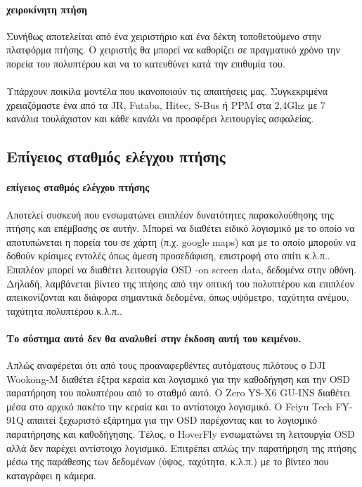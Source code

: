 \documentclass[a4paper, 12pt, twoside]{report}
\begin{document}
{{{{{{			\paragraph{χειροκίνητη πτήση}{Συνήθως αποτελείται από ένα χειριστήριο και ένα δέκτη τοποθετούμενο στην πλατφόρμα πτήσης. Ο χειριστής θα μπορεί να καθορίζει σε πραγματικό χρόνο την πορεία του πολυπτέρου και να το κατευθύνει κατά την επιθυμία του.
			}
			\paragraph{}{Υπάρχουν ποικίλα μοντέλα που ικανοποιούν τις απαιτήσεις μας. Συγκεκριμένα χρειαζόμαστε ένα από τα JR, Futaba, Hitec, S-Bus ή PPM στα 2,4Ghz με 7 κανάλια τουλάχιστον και κάθε κανάλι να προσφέρει λειτουργίες ασφαλείας.
			}
			
		\subsection{Επίγειος σταθμός ελέγχου πτήσης}	
			\paragraph{επίγειος σταθμός ελέγχου πτήσης}{Αποτελεί συσκευή που ενσωματώνει επιπλέον δυνατότητες παρακολούθησης της πτήσης και επέμβασης σε αυτήν. Μπορεί να διαθέτει ειδικό λογισμικό με το οποίο να αποτυπώνεται η πορεία του σε χάρτη (π.χ. google maps) και με το οποίο μπορούν να δοθούν κρίσιμες εντολές όπως άμεση προσεδάφιση, επιστροφή στο σπίτι κ.λ.π.. Επιπλέον μπορεί να διαθέτει λειτουργία OSD -on screen data, δεδομένα στην οθόνη. Δηλαδή, λαμβάνεται βίντεο της πτήσης από την οπτική του πολυπτέρου και επιπλέον απεικονίζονται και διάφορα σημαντικά δεδομένα, όπως υψόμετρο, ταχύτητα ανέμου, ταχύτητα πολυπτέρου κ.λ.π..
			}
			\paragraph{Το σύστημα αυτό δεν θα αναλυθεί στην έκδοση αυτή του κειμένου.}{Απλώς αναφέρεται ότι από τους προαναφερθέντες αυτόματους πιλότους ο DJI Wookong-M διαθέτει έξτρα κεραία και λογισμικό για την καθοδήγηση και την OSD παρατήρηση του πολυπτέρου από το σταθμό αυτό. Ο Zero YS-X6 GU-INS διαθέτει μέσα στο αρχικό πακέτο την κεραία και το αντίστοιχο λογισμικό. Ο Feiyu Tech FY-91Q απαιτεί ξεχωριστό εξάρτημα για την OSD παρέχοντας και το λογισμικό παρατήρησης και καθοδήγησης. Τέλος, ο HoverFly ενσωματώνει τη λειτουργία OSD αλλά δεν παρέχει αντίστοιχο λογισμικό. Επιτρέπει απλώς την παρατήρηση της πτήσης μέσω της παράθεσης των δεδομένων (ύψος, ταχύτητα, κ.λ.π.) με το βίντεο που καταγράφει η κάμερα.
			}
			
}}}}}}
\end{document}
